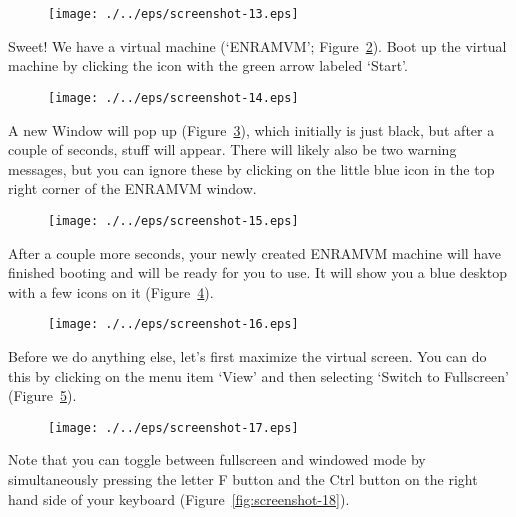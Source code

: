 \begin{figure}[ht]
  \centering
    \texttt{[image: ./../eps/screenshot-13.eps]}
  \caption{}
  \label{fig:screenshot-13}
\end{figure}
\clearpage

Sweet! We have a virtual machine (`ENRAMVM'; Figure~\ref{fig:screenshot-14}). Boot up the virtual machine by clicking the icon with the green arrow labeled `Start'.

\begin{figure}[ht]
  \centering
    \texttt{[image: ./../eps/screenshot-14.eps]}
  \caption{}
  \label{fig:screenshot-14}
\end{figure}


A new Window will pop up (Figure~\ref{fig:screenshot-15}), which initially is just black, but after a couple of seconds, stuff will appear. There will likely also be two warning messages, but you can ignore these by clicking on the little blue icon in the top right corner of the ENRAMVM window.


\begin{figure}[ht]
  \centering
    \texttt{[image: ./../eps/screenshot-15.eps]}
  \caption{}
  \label{fig:screenshot-15}
\end{figure}
\clearpage

After a couple more seconds, your newly created ENRAMVM machine will have finished booting and will be ready for you to use. It will show you a blue desktop with a few icons on it (Figure~\ref{fig:screenshot-16}).

\begin{figure}[ht]
  \centering
    \texttt{[image: ./../eps/screenshot-16.eps]}
  \caption{}
  \label{fig:screenshot-16}
\end{figure}


Before we do anything else, let's first maximize the virtual screen. You can do this by clicking on the menu item `View' and then selecting `Switch to Fullscreen' (Figure~\ref{fig:screenshot-17}).

\begin{figure}[ht]
  \centering
    \texttt{[image: ./../eps/screenshot-17.eps]}
  \caption{}
  \label{fig:screenshot-17}
\end{figure}
\clearpage


Note that you can toggle between fullscreen and windowed mode by simultaneously pressing the letter F button and the Ctrl button on the right hand side of your keyboard (Figure~\ref{fig:screenshot-18}).

